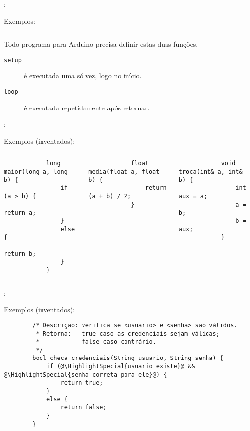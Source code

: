 \begin{frame}[fragile]{\insertsection: \insertsubsection}

	Exemplos:

	\inputminted{arduino}{\SketchPath{bare minimum}}

	Todo programa para Arduino precisa definir estas duas funções.
	\begin{description}
		\item[\texttt{setup}] é executada uma só vez, logo no início.
		\item[\texttt{loop}] é executada repetidamente após \texttt{} retornar.
	\end{description}

\end{frame}


\begin{frame}[fragile]{\insertsection: \insertsubsection}

	Exemplos (inventados):
	\begin{columns}[t]
		\begin{verbatim}
			long maior(long a, long b) {
				if (a > b) {
					return a;
				}
				else {
					return b;
				}
			}
		\end{verbatim}

		\begin{verbatim}
			float media(float a, float b) {
				return (a + b) / 2;
			}
		\end{verbatim}

		\vspace{-\medskipamount}
		\begin{verbatim}
			void troca(int& a, int& b) {
				int aux = a;
				a = b;
				b = aux;
			}
		\end{verbatim}
	\end{columns}

\end{frame}


\begin{frame}[fragile]{\insertsection: \insertsubsection}

	Exemplos (inventados):
	\begin{verbatim}
		/* Descrição: verifica se <usuario> e <senha> são válidos.
		 * Retorna:   true caso as credenciais sejam válidas;
		 *            false caso contrário.
		 */
		bool checa_credenciais(String usuario, String senha) {
			if (@\HighlightSpecial{usuario existe}@ && @\HighlightSpecial{senha correta para ele}@) {
				return true;
			}
			else {
				return false;
			}
		}
	\end{verbatim}

\end{frame}


